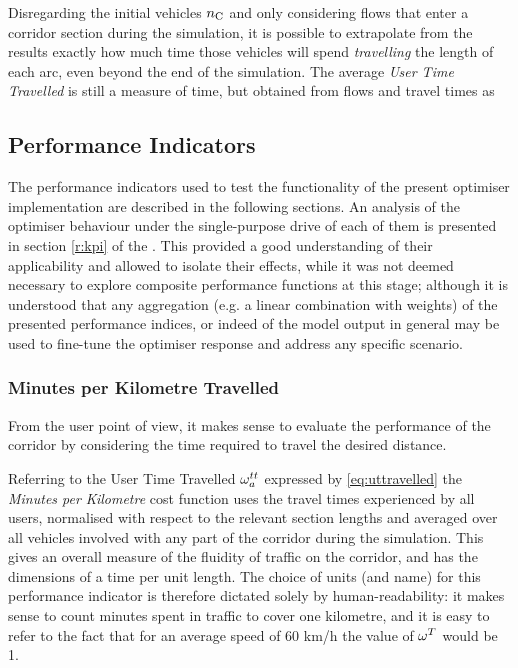 Disregarding the initial vehicles $n_{\mathrm{C}}$ and only considering flows that enter a corridor section during the simulation, it is possible to extrapolate from the results exactly how much time those vehicles will spend \emph{travelling} the length of each arc, even beyond the end of the simulation. The average \emph{User Time Travelled} is still a measure of time, but obtained from flows and travel times as



\subsection{Performance Indicators}

The performance indicators used to test the functionality of the present optimiser implementation are described in the following sections. An analysis of the optimiser behaviour under the single-purpose drive of each of them is presented in section \ref{r:kpi} of the . This provided a good understanding of their applicability and allowed to isolate their effects, while it was not deemed necessary to explore composite performance functions at this stage; although it is understood that any aggregation (e.g. a linear combination with weights) of the presented performance indices, or indeed of the model output in general may be used to fine-tune the optimiser response and address any specific scenario.

\subsubsection{Minutes per Kilometre Travelled}
From the user point of view, it makes sense to evaluate the performance of the corridor by considering the time required to travel the desired distance.

Referring to the User Time Travelled $\omega_{a}^{tt}$ expressed by \eqref{eq:uttravelled} the \emph{Minutes per Kilometre} cost function
uses the travel times experienced by all users, normalised with respect to the relevant section lengths and averaged over all vehicles involved with any part of the corridor during the simulation. This gives an overall measure of the fluidity of traffic on the corridor, and has the dimensions of a time per unit length. The choice of units (and name) for this performance indicator is therefore dictated solely by human-readability: it makes sense to count minutes spent in traffic to cover one kilometre, and it is easy to refer to the fact that for an average speed of 60 km/h the value of $\omega_{}^{T}$ would be 1.


